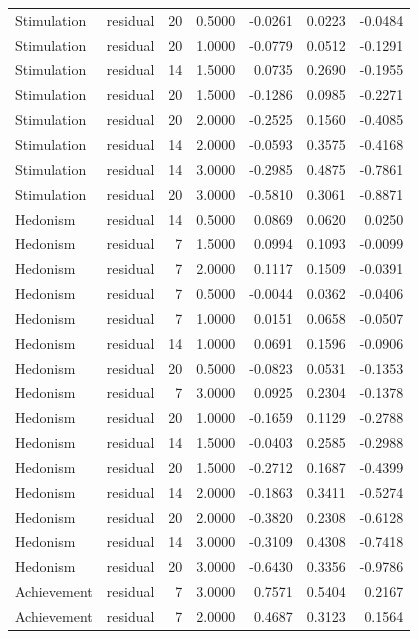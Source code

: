 \begin{tabular}{llrrrrr}
Stimulation & residual & 20 & 0.5000 & -0.0261 & 0.0223 & -0.0484 \\
Stimulation & residual & 20 & 1.0000 & -0.0779 & 0.0512 & -0.1291 \\
Stimulation & residual & 14 & 1.5000 & 0.0735 & 0.2690 & -0.1955 \\
Stimulation & residual & 20 & 1.5000 & -0.1286 & 0.0985 & -0.2271 \\
Stimulation & residual & 20 & 2.0000 & -0.2525 & 0.1560 & -0.4085 \\
Stimulation & residual & 14 & 2.0000 & -0.0593 & 0.3575 & -0.4168 \\
Stimulation & residual & 14 & 3.0000 & -0.2985 & 0.4875 & -0.7861 \\
Stimulation & residual & 20 & 3.0000 & -0.5810 & 0.3061 & -0.8871 \\
Hedonism & residual & 14 & 0.5000 & 0.0869 & 0.0620 & 0.0250 \\
Hedonism & residual & 7 & 1.5000 & 0.0994 & 0.1093 & -0.0099 \\
Hedonism & residual & 7 & 2.0000 & 0.1117 & 0.1509 & -0.0391 \\
Hedonism & residual & 7 & 0.5000 & -0.0044 & 0.0362 & -0.0406 \\
Hedonism & residual & 7 & 1.0000 & 0.0151 & 0.0658 & -0.0507 \\
Hedonism & residual & 14 & 1.0000 & 0.0691 & 0.1596 & -0.0906 \\
Hedonism & residual & 20 & 0.5000 & -0.0823 & 0.0531 & -0.1353 \\
Hedonism & residual & 7 & 3.0000 & 0.0925 & 0.2304 & -0.1378 \\
Hedonism & residual & 20 & 1.0000 & -0.1659 & 0.1129 & -0.2788 \\
Hedonism & residual & 14 & 1.5000 & -0.0403 & 0.2585 & -0.2988 \\
Hedonism & residual & 20 & 1.5000 & -0.2712 & 0.1687 & -0.4399 \\
Hedonism & residual & 14 & 2.0000 & -0.1863 & 0.3411 & -0.5274 \\
Hedonism & residual & 20 & 2.0000 & -0.3820 & 0.2308 & -0.6128 \\
Hedonism & residual & 14 & 3.0000 & -0.3109 & 0.4308 & -0.7418 \\
Hedonism & residual & 20 & 3.0000 & -0.6430 & 0.3356 & -0.9786 \\
Achievement & residual & 7 & 3.0000 & 0.7571 & 0.5404 & 0.2167 \\
Achievement & residual & 7 & 2.0000 & 0.4687 & 0.3123 & 0.1564 \\

\end{tabular}
